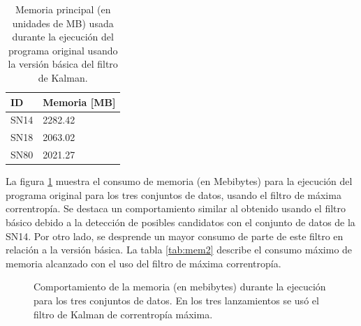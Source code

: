  
\begin{table}[h!]
\centering
\caption{Memoria principal (en unidades de MB) usada durante la ejecuci\'on del programa original usando la versi\'on b\'asica del filtro de Kalman.}
\begin{tabular}{|l|l|}
\hline
\textbf{ID} & Memoria [MB]\\\hline\hline
SN14 & 2282.42\\\hline
SN18 & 2063.02\\\hline
SN80 & 2021.27\\\hline
\end{tabular}

\label{tab:mem1}
\end{table}


La figura \ref{fig:mem_mcc} muestra el consumo de memoria (en Mebibytes) para la ejecuci\'on del programa original para los tres conjuntos de datos, usando el filtro de m\'axima correntrop\'ia. Se destaca un comportamiento similar al obtenido usando el filtro b\'asico debido a  la detecci\'on de posibles candidatos con el conjunto de datos de la SN14. Por otro lado, se desprende un mayor consumo de parte de este filtro en relaci\'on a la versi\'on b\'asica. La tabla \ref{tab:mem2} describe el consumo m\'aximo de memoria alcanzado con el uso del filtro de m\'axima correntrop\'ia.
\bigskip

\begin{figure}[h!]
\centering
{}\hfill
{}\vfill
{}
\caption{Comportamiento de la memoria (en mebibytes) durante la ejecuci\'on para los tres conjuntos de datos. En los tres lanzamientos se us\'o el filtro de Kalman de correntrop\'ia m\'axima.}
\label{fig:mem_mcc}
\end{figure}


